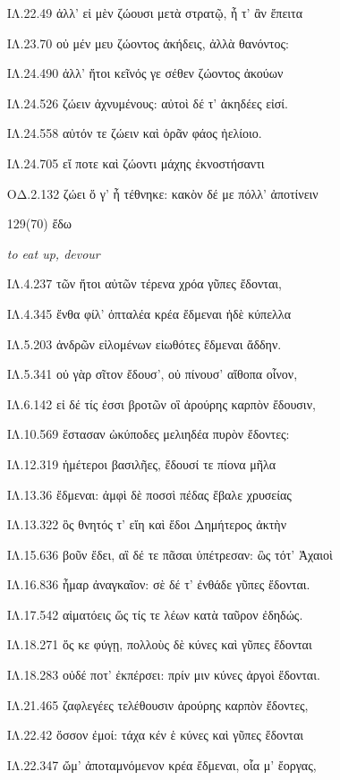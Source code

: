 \begin{enumerate}
{ΙΛ.22.49 ἀλλ' εἰ μὲν ζώουσι μετὰ στρατῷ, ἦ τ' ἂν ἔπειτα

ΙΛ.23.70 οὐ μέν μευ ζώοντος ἀκήδεις, ἀλλὰ θανόντος:

ΙΛ.24.490 ἀλλ' ἤτοι κεῖνός γε σέθεν ζώοντος ἀκούων

ΙΛ.24.526 ζώειν ἀχνυμένους: αὐτοὶ δέ τ' ἀκηδέες εἰσί.

ΙΛ.24.558 αὐτόν τε ζώειν καὶ ὁρᾶν φάος ἠελίοιο.

ΙΛ.24.705 εἴ ποτε καὶ ζώοντι μάχης ἐκνοστήσαντι

ΟΔ.2.132 ζώει ὅ γ' ἦ τέθνηκε: κακὸν δέ με πόλλ' ἀποτίνειν

}

\clearpage
\item[\large 129(70)]{\large \g ἔδω	}

\hspace{0.2cm} \textit{ to eat up, devour }

{\g
ΙΛ.4.237 τῶν ἤτοι αὐτῶν τέρενα χρόα γῦπες ἔδονται,

ΙΛ.4.345 ἔνθα φίλ' ὀπταλέα κρέα ἔδμεναι ἠδὲ κύπελλα

ΙΛ.5.203 ἀνδρῶν εἰλομένων εἰωθότες ἔδμεναι ἄδδην.

ΙΛ.5.341 οὐ γὰρ σῖτον ἔδουσ', οὐ πίνουσ' αἴθοπα οἶνον,

ΙΛ.6.142 εἰ δέ τίς ἐσσι βροτῶν οἳ ἀρούρης καρπὸν ἔδουσιν,

ΙΛ.10.569 ἕστασαν ὠκύποδες μελιηδέα πυρὸν ἔδοντες:

ΙΛ.12.319 ἡμέτεροι βασιλῆες, ἔδουσί τε πίονα μῆλα

ΙΛ.13.36 ἔδμεναι: ἀμφὶ δὲ ποσσὶ πέδας ἔβαλε χρυσείας

ΙΛ.13.322 ὃς θνητός τ' εἴη καὶ ἔδοι Δημήτερος ἀκτὴν

ΙΛ.15.636 βοῦν ἔδει, αἳ δέ τε πᾶσαι ὑπέτρεσαν: ὣς τότ' Ἀχαιοὶ

ΙΛ.16.836 ἦμαρ ἀναγκαῖον: σὲ δέ τ' ἐνθάδε γῦπες ἔδονται.

ΙΛ.17.542 αἱματόεις ὥς τίς τε λέων κατὰ ταῦρον ἐδηδώς.

ΙΛ.18.271 ὅς κε φύγῃ, πολλοὺς δὲ κύνες καὶ γῦπες ἔδονται

ΙΛ.18.283 οὐδέ ποτ' ἐκπέρσει: πρίν μιν κύνες ἀργοὶ ἔδονται.

ΙΛ.21.465 ζαφλεγέες τελέθουσιν ἀρούρης καρπὸν ἔδοντες,

ΙΛ.22.42 ὅσσον ἐμοί: τάχα κέν ἑ κύνες καὶ γῦπες ἔδονται

ΙΛ.22.347 ὤμ' ἀποταμνόμενον κρέα ἔδμεναι, οἷα μ' ἔοργας,

}
\end{enumerate}
